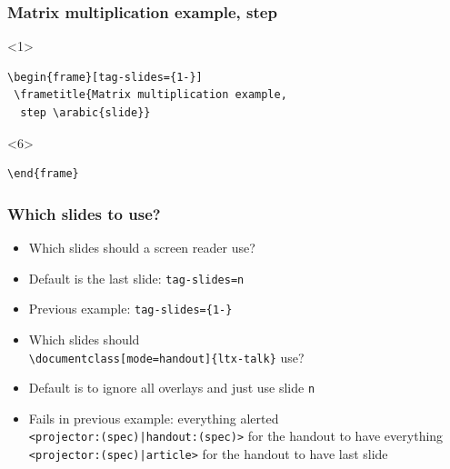 \documentclass{ltx-talk}
\begin{document}
\begin{frame*}[tag-slides={1-}]
\lstset{aboveskip=0pt,belowskip=0pt}
\frametitle{Matrix multiplication example,
 step }
 \begin{minipage}{.52\textwidth}
 \begin{onlyenv}<1>
\begin{lstlisting}
\begin{frame}[tag-slides={1-}]
 \frametitle{Matrix multiplication example,
  step \arabic{slide}}
\end{lstlisting}
 \end{onlyenv}
 \begin{onlyenv}<6>
 \begin{lstlisting}
\end{frame}
\end{lstlisting}
\end{onlyenv}
\end{minipage}%
\begin{minipage}{.48\textwidth}

\end{minipage}
\end{frame*}

\begin{frame*}
\frametitle{Which slides to use?}
\begin{itemize}
\item Which slides should a screen reader use?
\item Default is the last slide: \texttt{tag-slides=n}
\item Previous example: \texttt{tag-slides=\{1-\}}\bigskip
\item Which slides should\\
\verb|\documentclass[mode=handout]{ltx-talk}| use?
\item Default is to ignore all overlays and just use slide \texttt{n}
\item Fails in previous example: everything alerted\\
\verb#<projector:(spec)|handout:(spec)># for the handout to have everything\\
\verb#<projector:(spec)|article># for the handout to have last slide
\end{itemize}
\end{frame*}
\end{document}
